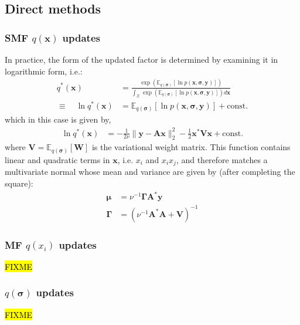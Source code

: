 \documentclass{article}
\newcommand{\m}[1]{\boldsymbol{#1}}
\newcommand{\E}[2]{\mathbb{E}_{#2}\left[ #1 \right]}
\begin{document}
\subsection{Direct methods}
\label{ss:var_direct}

\subsubsection{SMF $q(\m{x})$ updates}
In practice, the form of the updated factor is determined by examining
it in logarithmic form, i.e.:
\begin{equation}
\begin{aligned}
q^*(\m{x}) &= \frac{
 \exp\left(
  \E{\ln p(\m{x}, \m{\sigma}, \m{y})}{q(\m{\sigma})}
 \right)}
{\int_{\mathcal{X}} \exp\left(
  \E{\ln p(\m{x}, \m{\sigma}, \m{y})}{q(\m{\sigma})}
 \right) d\m{x}}
\\ \equiv \quad
\ln q^*(\m{x}) &=
 \E{\ln p(\m{x}, \m{\sigma}, \m{y})}{q(\m{\sigma})} + \text{const.}
\end{aligned}
\label{eq:direct_smf_x}
\end{equation}
which in this case is given by,
\begin{equation*}
\begin{aligned}
\ln q^*(\m{x}) &=
 -\frac{1}{2 \nu} \| \m{y} - \m{A} \m{x} \|_2^2
 -\frac{1}{2} \m{x}^* \m{V} \m{x}
 +\text{const.}
\end{aligned}
\end{equation*}
where $\m{V} = \E{\m{W}}{q(\m{\sigma})}$ is the variational weight matrix.
This function contains linear and quadratic terms in $\m{x}$, i.e. $x_i$
and $x_i x_j$, and therefore matches a multivariate normal whose mean
and variance are given by (after completing the square):
\begin{equation*}
\begin{aligned}
\m{\mu} &= \nu^{-1} \m{\Gamma} \m{A}^* \m{y}
\\
\m{\Gamma} &= \left( \nu^{-1} \m{A}^* \m{A} + \m{V} \right)^{-1}
\end{aligned}
\end{equation*}

\subsubsection{MF $q(x_i)$ updates}
\hl{FIXME}

\subsubsection{$q(\m{\sigma})$ updates}
\hl{FIXME}
\end{document}
